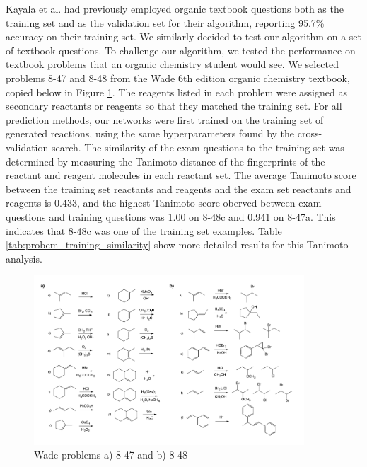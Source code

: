 Kayala et al.\cite{Kayala_2012} had previously employed organic textbook questions both as the training set and as the validation set for their algorithm, reporting 95.7\% accuracy on their training set. We similarly decided to test our algorithm on a set of textbook questions. To challenge our algorithm, we tested the performance on textbook problems that an organic chemistry student would see. We selected problems 8-47 and 8-48 from the Wade 6th edition organic chemistry textbook, copied below in Figure \ref{fig:Wade_problems_copy}\cite{wade2013organic}. The reagents listed in each problem were assigned as secondary reactants or reagents so that they matched the training set. For all prediction methods, our networks were first trained on the training set of generated reactions, using the same hyperparameters found by the cross-validation search. The similarity of the exam questions to the training set was determined by measuring the Tanimoto\cite{Bajusz_2015} distance of the fingerprints of the reactant and reagent molecules in each reactant set. The average Tanimoto score between the training set reactants and reagents and the exam set reactants and reagents is 0.433, and the highest Tanimoto score oberved between exam questions and training questions was 1.00 on 8-48c and 0.941 on 8-47a. This indicates that 8-48c was one of the training set examples. Table \ref{tab:probem_training_similarity}  show more detailed results for this Tanimoto analysis.

\begin{figure}
\begin{center}
\includegraphics[width=0.9\textwidth]{Wade_problems}
\caption[Organic Chemistry Test Problems]{\label{fig:Wade_problems_copy} Wade problems a) 8-47 and b) 8-48}
\end{center}
\end{figure}

